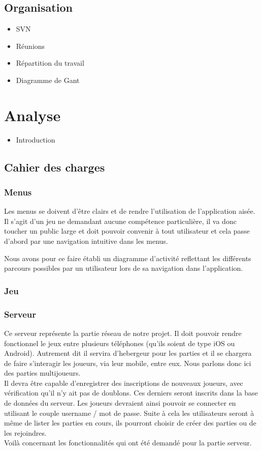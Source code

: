 \documentclass[]{report}
\begin{document}
	\section{Organisation}
		\begin{itemize}
			\item{SVN}
			\item{Réunions}
			\item{Répartition du travail}
			\item{Diagramme de Gant}
		\end{itemize}
	
	
\chapter{Analyse}
	\begin{itemize}
		\item{Introduction}
	\end{itemize}
	
	\section{Cahier des charges}
		\subsection{Menus}
		
		Les menus se doivent d'être clairs et de rendre l'utilisation de
		l'application aisée. Il s'agit d'un jeu ne demandant aucune compétence
		particulière, il va donc toucher un public large et doit pouvoir convenir à
		tout utilisateur et cela passe d'abord par une navigation intuitive dans les
		menus.
		
		Nous avons pour ce faire établi un diagramme d'activité reflettant les
		différents parcours possibles par un utilisateur lors de sa navigation dans
		l'application.
		
		\subsection{Jeu}
		\subsection{Serveur}
		
		Ce serveur représente la partie réseau de notre projet. Il doit pouvoir
		rendre fonctionnel le jeux entre plusieurs téléphones (qu'ils soient de type
		iOS ou Android). Autrement dit il servira d'hebergeur pour les parties et
		il se chargera de faire s'interagir les joueurs, via leur mobile, entre eux.
		Nous parlons donc ici des parties multijoueurs.\\ 
		Il devra être capable d'enregistrer des inscriptions de nouveaux joueurs, avec
		 vérification qu'il n'y ait pas de doublons. Ces derniers seront inscrits dans la base de données du serveur. Les joueurs devraient ainsi
		pouvoir se connecter en utilisant le couple username / mot de passe. Suite à
		cela les utilisateurs seront à même de lister les parties en cours, ils
		pourront choisir de créer des parties ou de les rejoindres.\\
		Voilà concernant les fonctionnalités qui ont été demandé pour la partie
		serveur.
	
\end{document}
